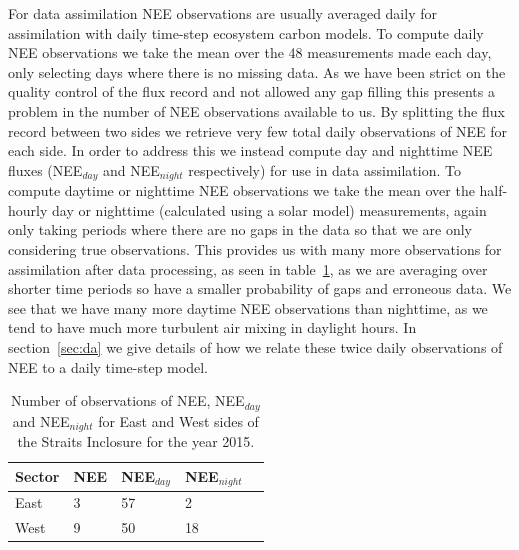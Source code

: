 \documentclass[11pt]{article}
\begin{document}
For data assimilation NEE observations are usually averaged daily for assimilation with daily time-step ecosystem carbon models. To compute daily NEE observations we take the mean over the 48 measurements made each day, only selecting days where there is no missing data. As we have been strict on the quality control of the flux record and not allowed any gap filling this presents a problem in the number of NEE observations available to us. By splitting the flux record between two sides we retrieve very few total daily observations of NEE for each side. In order to address this we instead compute day and nighttime NEE fluxes (NEE\(_{day}\) and NEE\(_{night}\) respectively) for use in data assimilation. To compute daytime or nighttime NEE observations we take the mean over the half-hourly day or nighttime (calculated using a solar model) measurements, again only taking periods where there are no gaps in the data so that we are only considering true observations. This provides us with many more observations for assimilation after data processing, as seen in table~\ref{table:nee_obs}, as we are averaging over shorter time periods so have a smaller probability of gaps and erroneous data. We see that we have many more daytime NEE observations than nighttime, as we tend to have much more turbulent air mixing in daylight hours. In section~\ref{sec:da} we give details of how we relate these twice daily observations of NEE to a daily time-step model.     

\begin{table}[ht] 
\begin{center}
	\begin{tabular}{| l | l | l | l | l |}
	\hline
	Sector & NEE & NEE\(_{day}\) & NEE\(_{night}\)  \\ \hline
	East & 3 & 57 & 2 \\ \hline
	West & 9 & 50 & 18 \\ \hline
	\end{tabular}
	\caption{Number of observations of NEE, NEE\(_{day}\) and NEE\(_{night}\) for East and West sides of the Straits Inclosure for the year 2015.}
	\label{table:nee_obs}
\end{center} 
\end{table}
\end{document}
